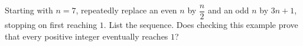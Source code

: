 Starting with $n=7$, repeatedly replace an even $n$ by $\dfrac{n}{2}$ and an odd $n$ by $3n+1$, stopping on first reaching $1$. List the sequence. Does checking this example prove that every positive integer eventually reaches $1$?
